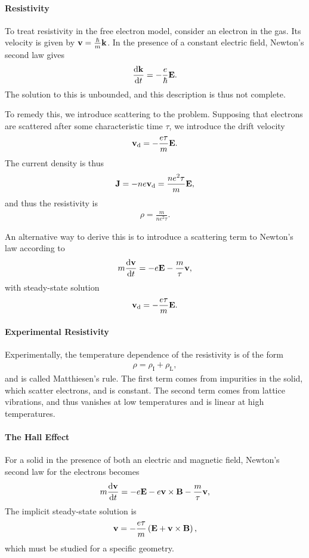 \paragraph{Resistivity}
To treat resistivity in the free electron model, consider an electron in the gas. Its velocity is given by $\vb{v} = \frac{\hbar}{m}\vb{k}$. In the presence of a constant electric field, Newton's second law gives
\begin{align*}
	\dv{\vb{k}}{t} = -\frac{e}{\hbar}\vb{E}.
\end{align*}
The solution to this is unbounded, and this description is thus not complete.

To remedy this, we introduce scattering to the problem. Supposing that electrons are scattered after some characteristic time $\tau$, we introduce the drift velocity
\begin{align*}
	\vb{v}_{\text{d}} = -\frac{e\tau}{m}\vb{E}.
\end{align*}
The current density is thus
\begin{align*}
	\vb{J} = -ne\vb{v}_{\text{d}} = \frac{ne^{2}\tau}{m}\vb{E},
\end{align*}
and thus the resistivity is
\begin{align*}
	\rho = \frac{m}{ne^{2}\tau}.
\end{align*}

An alternative way to derive this is to introduce a scattering term to Newton's law according to
\begin{align*}
	m\dv{\vb{v}}{t} = -e\vb{E} - \frac{m}{\tau}\vb{v},
\end{align*}
with steady-state solution
\begin{align*}
	\vb{v}_{\text{d}} = -\frac{e\tau}{m}\vb{E}.
\end{align*}

\paragraph{Experimental Resistivity}
Experimentally, the temperature dependence of the resistivity is of the form
\begin{align*}
	\rho = \rho_{\text{I}} + \rho_{\text{L}},
\end{align*}
and is called Matthiesen's rule. The first term comes from impurities in the solid, which scatter electrons, and is constant. The second term comes from lattice vibrations, and thus vanishes at low temperatures and is linear at high temperatures.

\paragraph{The Hall Effect}
For a solid in the presence of both an electric and magnetic field, Newton's second law for the electrons becomes
\begin{align*}
	m\dv{\vb{v}}{t} = -e\vb{E} - e\vb{v}\times\vb{B} - \frac{m}{\tau}\vb{v},
\end{align*}
The implicit steady-state solution is
\begin{align*}
	\vb{v} = -\frac{e\tau}{m}\left(\vb{E} + \vb{v}\times\vb{B}\right),
\end{align*}
which must be studied for a specific geometry.

